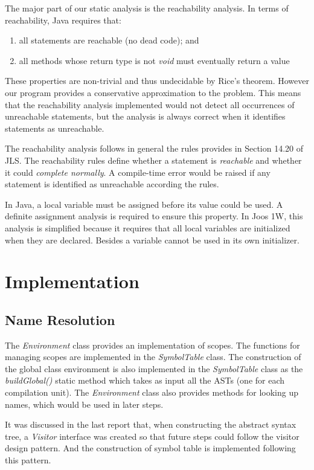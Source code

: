 \documentclass[a4paper, notitlepage]{report}
\begin{document}
The major part of our static analysis is the reachability analysis. In terms of reachability, Java requires that:
\begin{enumerate}
\item all statements are reachable (no dead code); and 
\item all methods whose return type is not \emph{void} must eventually return a value
\end{enumerate}
These properties are non-trivial and thus undecidable by Rice's theorem. However our program provides a conservative approximation to the problem. This means that the reachability analysis implemented would not detect all occurrences of unreachable statements, but the analysis is always correct when it identifies statements as unreachable.

The reachability analysis follows in general the rules provides in Section 14.20 of JLS. The reachability rules define whether a statement is \emph{reachable} and whether it could \emph{complete normally}. A compile-time error would be raised if any statement is identified as unreachable according the rules.

In Java, a local variable must be assigned before its value could be used. A definite assignment analysis is required to ensure this property. In Joos 1W, this analysis is simplified because it requires that all local variables are initialized when they are declared. Besides a variable cannot be used in its own initializer.

\clearpage
\chapter{Implementation}
\label{implementation}

\section{Name Resolution}


The \emph{Environment} class provides an implementation of scopes. The functions for managing scopes are implemented in the \emph{SymbolTable} class. The construction of the global class environment is also implemented in the \emph{SymbolTable} class as the \emph{buildGlobal()} static method which takes as input all the ASTs (one for each compilation unit). The \emph{Environment} class also provides methods for looking up names, which would be used in later steps.

It was discussed in the last report that, when constructing the abstract syntax tree, a \emph{Visitor} interface was created so that future steps could follow the visitor design pattern. And the construction of symbol table is implemented following this pattern.
\end{document}
